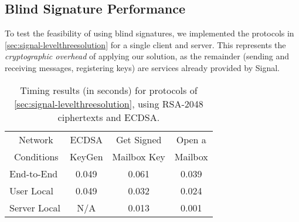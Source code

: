 








\subsection{Blind Signature Performance} %
\label{sec:signal-impl}

To test the feasibility of using blind signatures, we implemented the
protocols in \cref{sec:signal-levelthreesolution} for a single client and
server. This represents the \emph{cryptographic overhead} of applying
our solution, as the remainder (sending and receiving messages,
registering keys) are services already provided by Signal.

\begin{table}
\centering
  \begin{tabular}{l|ccc}
      \toprule
     ~~Network  & ECDSA  & Get Signed  & Open a \\
    ~Conditions & KeyGen & Mailbox Key & Mailbox \\
    \midrule
    End-to-End & 0.049 &    0.061   & 0.039 \\ 
    User Local & 0.049 &    0.032   & 0.024 \\
    Server Local & N/A &    0.013   & 0.001 \\
    \bottomrule
  \end{tabular}
        \caption{Timing results (in seconds) for protocols of
        \cref{sec:signal-levelthreesolution}, using RSA-2048 ciphertexts and ECDSA.
        }
  \label{tbl:signal-timing_results}
\end{table}


